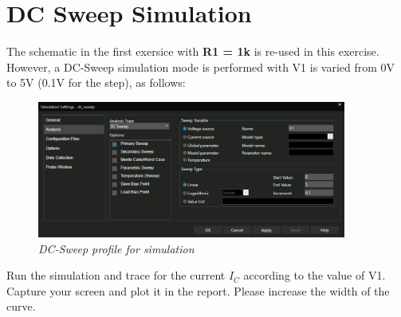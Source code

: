\section{DC Sweep Simulation}
The schematic in the first exersice with \textbf{R1 = 1k} is re-used in this exercise. However, a DC-Sweep simulation mode is performed with V1 is varied from 0V to 5V (0.1V for the step), as follows:

\begin{figure}[!htp]
    \centering
    \includegraphics[width=4in]{graphics/ex2/f1.PNG}
    \caption{\textit{DC-Sweep profile for simulation}}
\end{figure}

Run the simulation and trace for the current $I_C$ according to the value of V1. Capture your screen and plot it in the report. Please increase the width of the curve.